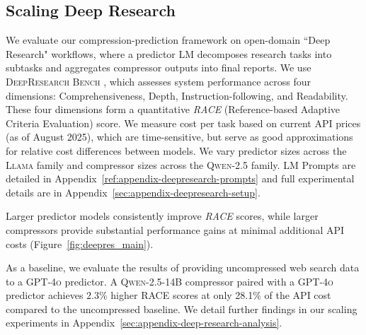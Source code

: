 \documentclass{article} %
\begin{document}



\subsection{Scaling Deep Research}
\label{sec:scaling-deepresearch}
We evaluate our compression-prediction framework on open-domain ``Deep Research" workflows, where a predictor LM decomposes research tasks into subtasks and aggregates compressor outputs into final reports. We use \textsc{DeepResearch Bench} \citep{du2025deepresearch}, which assesses system performance across four dimensions:  Comprehensiveness, Depth, Instruction-following, and Readability. These four dimensions form a quantitative \textit{RACE} (Reference-based Adaptive Criteria Evaluation) score. We measure cost per task based on current API prices (as of August 2025), which are time-sensitive, but serve as good approximations for relative cost differences between models. We vary predictor sizes across the \textsc{Llama} family and compressor sizes across the \textsc{Qwen-2.5} family. LM Prompts are detailed in Appendix~\ref{ref:appendix-deepresearch-prompts} and full experimental details are in Appendix~\ref{sec:appendix-deepresearch-setup}.

Larger predictor models consistently improve \textit{RACE} scores, while larger compressors provide substantial performance gains at minimal additional API costs (Figure~\ref{fig:deepres_main}).

As a baseline, we evaluate the results of providing uncompressed web search data to a \textsc{GPT-4o} predictor. A \textsc{Qwen-2.5-14B} compressor paired with a \textsc{GPT-4o} predictor achieves $2.3\%$ higher RACE scores at only 28.1\% of the API cost compared to the uncompressed baseline. We detail further findings in our scaling experiments in Appendix~\ref{sec:appendix-deep-research-analysis}.
\end{document}
